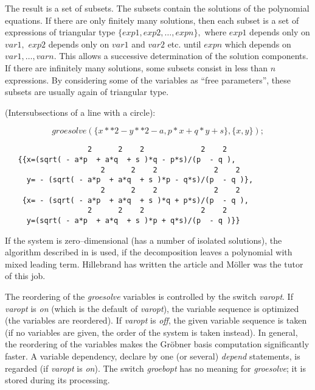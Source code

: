 The result is a set of subsets. The subsets contain the solutions of the
polynomial equations. If there are only finitely many solutions,
then each subset is a set of expressions of triangular type
$\{exp1, exp2,\ldots , expn\},$ where $exp1$ depends only on
$var1,$ $exp2$ depends only on $var1$ and $var2$ etc. until $expn$ which
depends on $var1,\ldots,varn.$ This allows a successive determination of
the solution components. If there are infinitely many solutions,
some subsets consist in less than $n$ expressions. By considering some
of the variables as ``free parameters'',  these subsets are usually
again of triangular type.

\example (Intersubsections of a line with a circle):

\[ groesolve(\{x**2 - y**2 - a, p*x+q*y+s\},\{x,y\}); \]

\begin{verbatim}
                   2      2    2             2    2
   {{x=(sqrt( - a*p  + a*q  + s )*q - p*s)/(p  - q ),
                      2      2    2             2    2
     y= - (sqrt( - a*p  + a*q  + s )*p - q*s)/(p  - q )},
                      2      2    2             2    2
    {x= - (sqrt( - a*p  + a*q  + s )*q + p*s)/(p  - q ),
                   2      2    2             2    2
     y=(sqrt( - a*p  + a*q  + s )*p + q*s)/(p  - q )}}
\end{verbatim}

If the system is zero--dimensional (has a number of isolated solutions),
the algorithm described in \cite{Hillebrand:99} is used, if the decomposition
leaves a polynomial with mixed leading term. Hillebrand has written the
article and M\"oller was the tutor of this job.

The reordering of the \emph{groesolve} variables is controlled by the
\REDUCE switch \emph{varopt}. If \emph{varopt} is \emph{on} (which is the default
of \emph{varopt}), the variable sequence is optimized (the variables are reordered).
If \emph{varopt} is \emph{off}, the given variable sequence is taken (if no variables
are given, the order of the \REDUCE system is taken instead). In general, the
reordering of the variables makes the Gr\"obner basis computation
significantly faster.
A variable dependency, declare by one (or several) \emph{depend} statements,
is regarded (if \emph{varopt} is \emph{on}). The switch \emph{groebopt} has no meaning
for \emph{groesolve}; it is stored during its processing.

